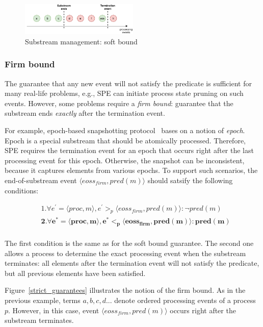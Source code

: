 \begin{figure}[htbp]
  \centering
  \includegraphics[width=0.50\textwidth]{pics/general-guarantee.pdf}
  \caption{Substream management: soft bound}
  \label{general_guarantees}
\end{figure}

\subsubsection{Firm bound}

The guarantee that any new event will not satisfy the predicate is sufficient for many real-life problems, e.g., SPE can initiate process state pruning on such events. However, some problems require a {\em firm bound}: guarantee that the substream ends {\em exactly} after the termination event. 

For example, epoch-based snapshotting protocol~\cite{2015arXiv150608603C, jacques2016consistent} bases on a notion of {\em epoch}. Epoch is a special substream that should be atomically processed. Therefore, SPE requires the termination event for an epoch that occurs right after the last processing event for this epoch. Otherwise, the snapshot can be inconsistent, because it captures elements from various epochs. To support such scenarios, the end-of-substream event $\langle eoss_{firm}, pred(m)\rangle$ should satsify the following conditions:

\begin{align*}
&1. \forall e^{'} = \langle proc,m\rangle, e^{'} >_p \langle eoss_{firm}, pred(m)\rangle : \neg pred(m) \\
&\boldsymbol{2. \forall e^{*} = \langle proc,m\rangle, e^{*} <_p \langle eoss_{firm}, pred(m)\rangle : pred(m)} \\
\end{align*}

The first condition is the same as for the soft bound guarantee. The second one allows a process to determine the exact processing event when the substream terminates: all elements after the termination event will not satisfy the predicate, but all previous elements have been satisfied. 

Figure~\ref{strict_guarantees} illustrates the notion of the firm bound. As in the previous example, terms $a,b,c,d...$ denote ordered processing events of a process $p$. However, in this case, event $\langle eoss_{firm}, pred(m)\rangle$ occurs right after the substream terminates.

